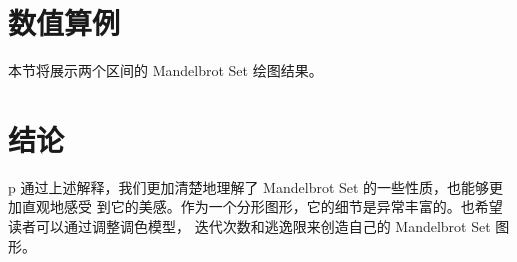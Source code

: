 \documentclass{ctexart}
\begin{document}
    \section{数值算例}
    本节将展示两个区间的 Mandelbrot Set 绘图结果。
    \begin{figure}[H]
        \centering
    \end{figure}
    \section{结论}\label{S5}
    \begin{tabular}{p\columnwidth}
        通过上述解释，我们更加清楚地理解了 Mandelbrot Set 的一些性质，也能够更加直观地感受
        到它的美感。作为一个分形图形，它的细节是异常丰富的。也希望读者可以通过调整调色模型，
        迭代次数和逃逸限来创造自己的 Mandelbrot Set 图形。
    \end{tabular}
    
\end{document}
